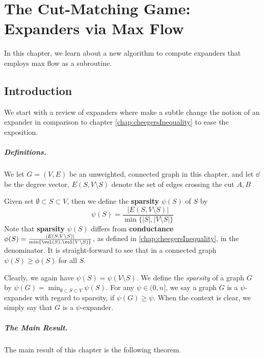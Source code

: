\chapter{The Cut-Matching Game: Expanders via Max Flow}

In this chapter, we learn about a new algorithm to compute expanders that employs max flow as a subroutine.

\section{Introduction}

We start with a review of expanders where make a subtle change the notion of an expander in comparison to chapter \ref{chap:cheegersInequality} to ease the exposition.

\paragraph{Definitions.} We let $G=(V,E)$ be an unweighted, connected graph in this chapter, and let $\dd$ be the degree vector, $E(S,V \setminus S)$ denote the set of edges crossing the cut $A,B$

Given set $\emptyset \subset S \subset V$, then we define the \textbf{sparsity} $\psi(S)$ of $S$ by
\[
\psi(S) = \frac{|E(S, V \setminus S)|}{ \min\{|S|, |V \setminus S| \} } 
\]
Note that \textbf{sparsity} $\psi(S)$ differs from \textbf{conductance} $\phi(S) = \frac{|E(S, V \setminus S)|}{ \min\{\vol(S), \vol(V \setminus S) \} }$, as defined in \ref{chap:cheegersInequality}, in the denominator. It is straight-forward to see that in a connected graph $\psi(S) \geq \phi(S)$ for all $S$. 

Clearly, we again have $\psi(S) = \psi(V \setminus S)$. We define the \emph{sparsity} of a graph $G$ by $\psi(G) = \min_{\emptyset \subset S \subset V} \psi(S)$. For any $\psi \in (0, n]$, we say a graph $G$ is a $\psi$-expander with regard to sparsity, if $\psi(G) \geq \psi$. When the context is clear, we simply say that $G$ is a $\psi$-expander. 

\paragraph{The Main Result.} The main result of this chapter is the following theorem.


